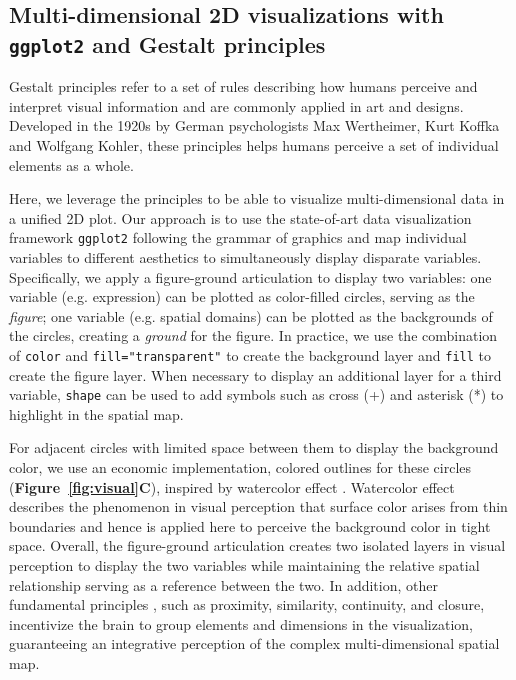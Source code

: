\documentclass[10pt,twocolumn]{article}
\begin{document}
\subsection{Multi-dimensional 2D visualizations with \texttt{ggplot2} and Gestalt principles}

Gestalt principles\cite{todorovic_2008, palmer_1999} refer to a set of rules describing how humans perceive and interpret visual information and are commonly applied in art and designs. Developed in the 1920s by German psychologists Max Wertheimer, Kurt Koffka and Wolfgang Kohler, these principles helps humans perceive a set of individual elements as a whole. 

Here, we leverage the principles to be able to visualize multi-dimensional data in a unified 2D plot. Our approach is to use the state-of-art data visualization framework \texttt{ggplot2} \cite{ggplot2} following the grammar of graphics \cite{wilkinson_2012} and map individual variables to different aesthetics to simultaneously display disparate variables. Specifically, we apply a figure-ground articulation to display two variables: one variable (e.g. expression) can be plotted as color-filled circles, serving as the \textit{figure}; one variable (e.g. spatial domains) can be plotted as the backgrounds of the circles, creating a \textit{ground} for the figure. In practice, we use the combination of \texttt{color} and \texttt{fill="transparent"} to create the background layer and \texttt{fill} to create the figure layer. When necessary to display an additional layer for a third variable, \texttt{shape} can be used to add symbols such as cross (+) and asterisk (*) to highlight in the spatial map.


For adjacent circles with limited space between them to display the background color, we use an economic implementation, colored outlines for these circles (\textbf{Figure~\ref{fig:visual}C}), inspired by watercolor effect \cite{pinna_1987, pinna_2001}. Watercolor effect describes the phenomenon in visual perception that surface color arises from thin boundaries and hence is applied here to perceive the background color in tight space. Overall, the figure-ground articulation creates two isolated layers in visual perception to display the two variables while maintaining the relative spatial relationship serving as a reference between the two. In addition, other fundamental principles \cite{todorovic_2008}, such as proximity, similarity, continuity, and closure, incentivize the brain to group elements and dimensions in the visualization, guaranteeing an integrative perception of the complex multi-dimensional spatial map.
\end{document}
